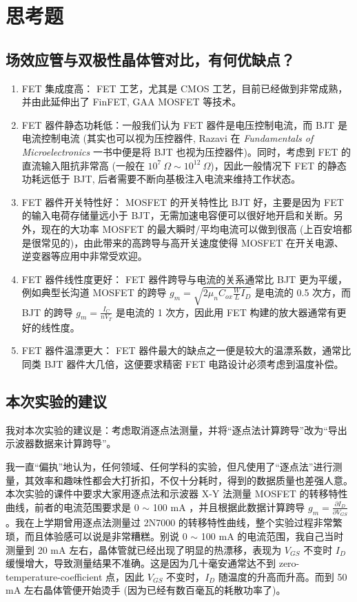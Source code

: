 \documentclass[UTF8]{article}
\begin{document}
\section{思考题}

\subsection{场效应管与双极性晶体管对比，有何优缺点？}

\begin{enumerate}
\item FET 集成度高： FET 工艺，尤其是 CMOS 工艺，目前已经做到非常成熟，并由此延伸出了 FinFET, GAA MOSFET 等技术。
\item FET 器件静态功耗低：一般我们认为 FET 器件是电压控制电流，而 BJT 是电流控制电流 (其实也可以视为压控器件, Razavi 在 \textit{Fundamentals of Microelectronics} 一书中便是将 BJT 也视为压控器件)。同时，考虑到 FET 的直流输入阻抗非常高 (一般在 $10^7 \ \Omega \sim 10^{12}\ \Omega$)，因此一般情况下 FET 的静态功耗远低于 BJT, 后者需要不断向基极注入电流来维持工作状态。
\item FET 器件开关特性好： MOSFET 的开关特性比 BJT 好，主要是因为 FET 的输入电荷存储量远小于 BJT，无需加速电容便可以很好地开启和关断。另外，现在的大功率 MOSFET 的最大瞬时/平均电流可以做到很高 (上百安培都是很常见的)，由此带来的高跨导与高开关速度使得 MOSFET 在开关电源、逆变器等应用中非常受欢迎。
\item FET 器件线性度更好： FET 器件跨导与电流的关系通常比 BJT 更为平缓，例如典型长沟道 MOSFET 的跨导 $g_m = \sqrt{2 \mu_n C_{ox} \frac{W}{L}I_D}$ 是电流的 0.5 次方，而 BJT 的跨导 $g_m = \frac{I_C}{nV_T}$ 是电流的 1 次方，因此用 FET 构建的放大器通常有更好的线性度。
\item FET 器件温漂更大： FET 器件最大的缺点之一便是较大的温漂系数，通常比同类 BJT 器件大几倍，这便要求精密 FET 电路设计必须考虑到温度补偿。
\end{enumerate} 

\subsection{本次实验的建议}

我对本次实验的建议是：考虑取消逐点法测量，并将“逐点法计算跨导”改为“导出示波器数据来计算跨导”。

我一直“偏执”地认为，任何领域、任何学科的实验，但凡使用了“逐点法”进行测量，其效率和趣味性都会大打折扣，不仅十分耗时，得到的数据质量也差强人意。本次实验的课件中要求大家用逐点法和示波器 X-Y 法测量 MOSFET 的转移特性曲线，前者的电流范围要求是 0 $\sim$ 100 mA ，并且根据此数据计算跨导 $g_m = \frac{\partial I_D }{\partial V_{GS} }$。我在上学期曾用逐点法测量过 2N7000 的转移特性曲线，整个实验过程非常繁琐，而且体验感可以说是非常糟糕。别说 0 $\sim$ 100 mA 的电流范围，我自己当时测量到 20 mA 左右，晶体管就已经出现了明显的热漂移，表现为 $V_{GS}$ 不变时 $I_D$ 缓慢增大，导致测量结果不准确。这是因为几十毫安通常达不到 zero-temperature-coefficient 点，因此 $V_{GS}$ 不变时，$I_D$ 随温度的升高而升高。而到 50 mA 左右晶体管便开始烫手 (因为已经有数百毫瓦的耗散功率了)。
\end{document}
